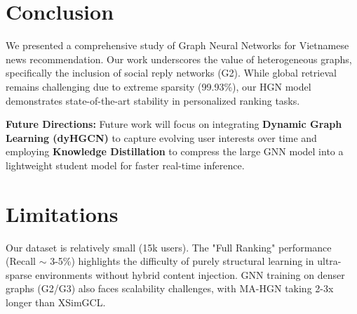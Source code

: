 \documentclass[11pt]{article}
\begin{document}
\section{Conclusion}
We presented a comprehensive study of Graph Neural Networks for Vietnamese news recommendation. Our work underscores the value of heterogeneous graphs, specifically the inclusion of social reply networks (G2). While global retrieval remains challenging due to extreme sparsity (99.93\%), our HGN model demonstrates state-of-the-art stability in personalized ranking tasks.

\textbf{Future Directions:} Future work will focus on integrating \textbf{Dynamic Graph Learning (dyHGCN)} to capture evolving user interests over time and employing \textbf{Knowledge Distillation} to compress the large GNN model into a lightweight student model for faster real-time inference.

\section*{Limitations}
Our dataset is relatively small (15k users). The "Full Ranking" performance (Recall $\sim$ 3-5\%) highlights the difficulty of purely structural learning in ultra-sparse environments without hybrid content injection. GNN training on denser graphs (G2/G3) also faces scalability challenges, with MA-HGN taking 2-3x longer than XSimGCL.


\end{document}
